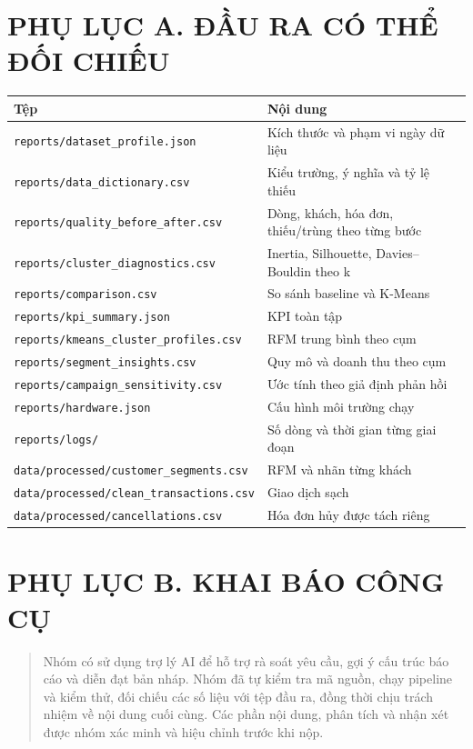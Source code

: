 \documentclass[a4paper]{article}
\begin{document}
\section*{PHỤ LỤC A. ĐẦU RA CÓ THỂ ĐỐI CHIẾU}

\begin{table}[htbp]
\centering
\small
\begin{tabularx}{\textwidth}{|>{\raggedright\arraybackslash}X|>{\raggedright\arraybackslash}X|}
\hline
\textbf{Tệp} & \textbf{Nội dung} \\
\hline
\texttt{reports/dataset\_profile.json} & Kích thước và phạm vi ngày dữ liệu \\
\hline
\texttt{reports/data\_dictionary.csv} & Kiểu trường, ý nghĩa và tỷ lệ thiếu \\
\hline
\texttt{reports/quality\_before\_after.csv} & Dòng, khách, hóa đơn, thiếu/trùng theo từng bước \\
\hline
\texttt{reports/cluster\_diagnostics.csv} & Inertia, Silhouette, Davies--Bouldin theo k \\
\hline
\texttt{reports/comparison.csv} & So sánh baseline và K-Means \\
\hline
\texttt{reports/kpi\_summary.json} & KPI toàn tập \\
\hline
\texttt{reports/kmeans\_cluster\_profiles.csv} & RFM trung bình theo cụm \\
\hline
\texttt{reports/segment\_insights.csv} & Quy mô và doanh thu theo cụm \\
\hline
\texttt{reports/campaign\_sensitivity.csv} & Ước tính theo giả định phản hồi \\
\hline
\texttt{reports/hardware.json} & Cấu hình môi trường chạy \\
\hline
\texttt{reports/logs/} & Số dòng và thời gian từng giai đoạn \\
\hline
\texttt{data/processed/customer\_segments.csv} & RFM và nhãn từng khách \\
\hline
\texttt{data/processed/clean\_transactions.csv} & Giao dịch sạch \\
\hline
\texttt{data/processed/cancellations.csv} & Hóa đơn hủy được tách riêng \\
\hline
\end{tabularx}
\end{table}


\section*{PHỤ LỤC B. KHAI BÁO CÔNG CỤ}

\begin{quote}
Nhóm có sử dụng trợ lý AI để hỗ trợ rà soát yêu cầu, gợi ý cấu trúc báo cáo và diễn đạt bản nháp. Nhóm đã tự kiểm tra mã nguồn, chạy pipeline và kiểm thử, đối chiếu các số liệu với tệp đầu ra, đồng thời chịu trách nhiệm về nội dung cuối cùng. Các phần nội dung, phân tích và nhận xét được nhóm xác minh và hiệu chỉnh trước khi nộp.
\end{quote}
\end{document}
